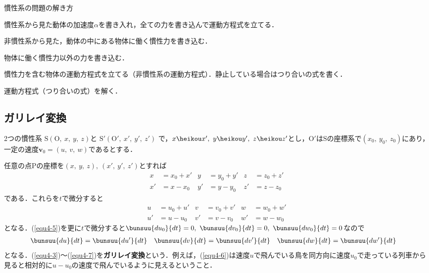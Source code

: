 慣性系の問題の解き方
\begin{enumerate}[label=\textbf{[\arabic*]}, labelsep=10pt, leftmargin=23pt]
	\item 慣性系から見た動体の加速度$\alpha$を書き入れ，全ての力を書き込んで運動方程式を立てる．
	\item 非慣性系から見た，動体の中にある物体に働く慣性力を書き込む．
	\item 物体に働く慣性力以外の力を書き込む．
	\item 慣性力を含む物体の運動方程式を立てる（非慣性系の運動方程式）．静止している場合はつり合いの式を書く．
	\item 運動方程式（つり合いの式）を解く．
\end{enumerate}



\subsection{ガリレイ変換}

2つの慣性系
$\mathrm{S}(\mathrm{O},\ x,\ y,\ z)$と
$\mathrm{S}'(\mathrm{O}',\ x',\ y',\ z')$
で，$x \heikou x',\ y \heikou y',\ z \heikou z'$とし，$\mathrm{O}'$は$\mathrm{S}$の座標系で$(x_0,\ y_0,\ z_0)$にあり，一定の速度$\bm{v}_0 = (u,\ v,\ w)$であるとする．

任意の点$\mathrm{P}$の座標を$(x,\ y,\ z),\ (x',\ y',\ z')$とすれば
\begin{align}
	x &= x_0 + x' & y &= y_0 + y' & z &= z_0 + z' \label{equ4-3}\\
	x' &= x - x_0 & y' &= y - y_0 & z' &= z - z_0 \label{equ4-4}
\end{align}
である．これらを$t$で微分すると
\begin{align}
	u &= u_0 + u' & v &= v_0 + v' & w &= w_0 + w' \label{equ4-5}\\
	u' &= u - u_0 & v' &= v - v_0 & w' &= w - w_0 \label{equ4-6}
\end{align}
となる．(\ref{equ4-5})を更に$t$で微分すると$\bunsuu{du_0}{dt} = 0,\ \bunsuu{dv_0}{dt} = 0,\ \bunsuu{dw_0}{dt} = 0$なので
\begin{align}
	\bunsuu{du}{dt} &= \bunsuu{du'}{dt} &
	\bunsuu{dv}{dt} &= \bunsuu{dv'}{dt} &
	\bunsuu{dw}{dt} &= \bunsuu{dw'}{dt} \label{equ4-7}
\end{align}
となる．(\ref{equ4-3})～(\ref{equ4-7})を\textbf{ガリレイ変換}という．例えば，(\ref{equ4-6})は速度$u$で飛んでいる鳥を同方向に速度$u_0$で走っている列車から見ると相対的に$u - u_0$の速度で飛んでいるように見えるということ．

